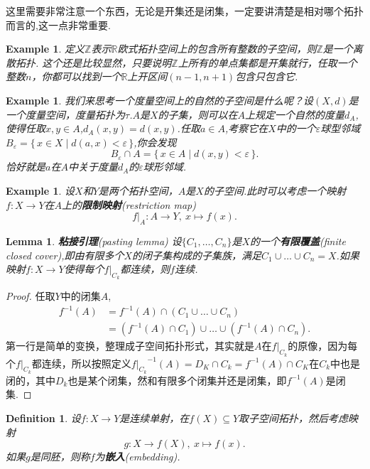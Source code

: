 \documentclass{article}
\newtheorem{lemma}[theorem]{Lemma}
\newtheorem{example}[theorem]{Example}
\newtheorem{definition}[theorem]{Definition}
\newcommand*{\xfunc}[4]{{#2}\colon{#3}{#1}{#4}}
\newcommand*{\func}[3]{\xfunc{\to}{#1}{#2}{#3}}
\newcommand\Set[2]{\{\,#1\mid#2\,\}} %
\begin{document}
这里需要非常注意一个东西，无论是开集还是闭集，一定要讲清楚是相对哪个拓扑而言的,这一点非常重要.

\begin{example}
定义$\mathbb{Z}$表示$\mathbb{R}$欧式拓扑空间上的包含所有整数的子空间，则$\mathbb{Z}$是一个离散拓扑. 这个还是比较显然，只要说明$\mathbb{Z}$上所有的单点集都是开集就行，任取一个整数$n$，你都可以找到一个$\mathbb{R}$上开区间$(n-1,n+1)$包含只包含它.
\end{example}


\begin{example}
我们来思考一个度量空间上的自然的子空间是什么呢？设$(X,d)$是一个度量空间，度量拓扑为$\tau$.$A$是$X$的子集，则可以在$A$上规定一个自然的度量$d_A$,使得任取$x,y \in A$,$d_A(x,y)=d(x,y)$.任取$a \in A$,考察它在$X$中的一个$\varepsilon$球型邻域$B_\varepsilon=\Set{x \in X}{d(a,x) < \varepsilon}$,你会发现\[B_\varepsilon \cap A = \Set{x \in A}{d(x,y) < \varepsilon}.\]恰好就是$a$在$A$中关于度量$d_A$的$\varepsilon$球形邻域.	
\end{example}


\begin{example}
设$X$和$Y$是两个拓扑空间，$A$是$X$的子空间.此时可以考虑一个映射$\func{f}{X}{Y}$在$A$上的\textbf{限制映射}(restriction map)\[\func{f|_A}{A}{Y},\ x \mapsto f(x).\]
\end{example}

\begin{lemma}
\textbf{粘接引理}(pasting lemma) 设$\{C_1,\ldots,C_n\}$是$X$的一个\textbf{有限覆盖}(finite closed cover),即由有限多个$X$的闭子集构成的子集族，满足$C_1 \cup \ldots \cup C_n=X$.如果映射$\func{f}{X}{Y}$使得每个$f|_{C_k}$都连续，则$f$连续.
\end{lemma}

\begin{proof}
任取$Y$中的闭集$A$,\[\begin{aligned} 
					f^{-1}(A)&=f^{-1}(A) \cap (C_1 \cup \ldots \cup C_n)\\
					&=(f^{-1}(A) \cap C_1) \cup \ldots \cup (f^{-1}(A) \cap C_n).\end{aligned}\]第一行是简单的变换，整理成子空间拓扑形式，其实就是$A$在$f|_{C_k}$的原像，因为每个$f|_{C_k}$都连续，所以按照定义${f|_{C_k}}^{-1}(A)=D_K \cap C_k = f^{-1}({A}) \cap C_K $在$C_k$中也是闭的，其中$D_k$也是某个闭集，然和有限多个闭集并还是闭集，即$f^{-1}(A)$是闭集.
\end{proof}

\begin{definition}
设$\func{f}{X}{Y}$是连续单射，在$f(X) \subseteq Y$取子空间拓扑，然后考虑映射\[\func{g}{X}{f(X)},\ x \mapsto f(x).\]如果$g$是同胚，则称$f$为\textbf{嵌入}(embedding).
\end{definition}
\end{document}
